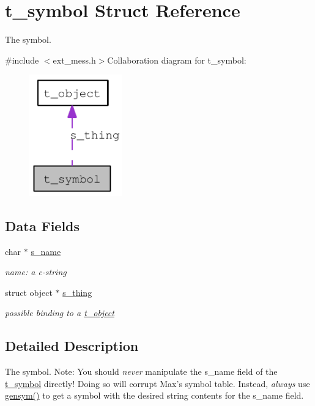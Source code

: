 \hypertarget{structt__symbol}{
\section{t\_\-symbol Struct Reference}
\label{structt__symbol}
}


The symbol.  


{\ttfamily \#include $<$ext\_\-mess.h$>$}Collaboration diagram for t\_\-symbol:\nopagebreak
\begin{figure}[H]
\begin{center}
\leavevmode
\includegraphics[width=114pt]{structt__symbol__coll__graph}
\end{center}
\end{figure}
\subsection*{Data Fields}
\begin{DoxyCompactItemize}
\item 
\hypertarget{structt__symbol_ae2bf70cea045897c171f39116bf536c8}{
char $\ast$ \hyperlink{structt__symbol_ae2bf70cea045897c171f39116bf536c8}{s\_\-name}}
\label{structt__symbol_ae2bf70cea045897c171f39116bf536c8}

\begin{DoxyCompactList}\small\item\em name: a c-\/string \item\end{DoxyCompactList}\item 
\hypertarget{structt__symbol_abd835e42c1c3ef3ed958c22cc73c9e69}{
struct object $\ast$ \hyperlink{structt__symbol_abd835e42c1c3ef3ed958c22cc73c9e69}{s\_\-thing}}
\label{structt__symbol_abd835e42c1c3ef3ed958c22cc73c9e69}

\begin{DoxyCompactList}\small\item\em possible binding to a \hyperlink{structt__object}{t\_\-object} \item\end{DoxyCompactList}\end{DoxyCompactItemize}


\subsection{Detailed Description}
The symbol. Note: You should {\itshape never\/} manipulate the s\_\-name field of the \hyperlink{structt__symbol}{t\_\-symbol} directly! Doing so will corrupt Max's symbol table. Instead, {\itshape always\/} use \hyperlink{group__symbol_ga8268797d125a15bae1010af70b559e05}{gensym()} to get a symbol with the desired string contents for the s\_\-name field. 